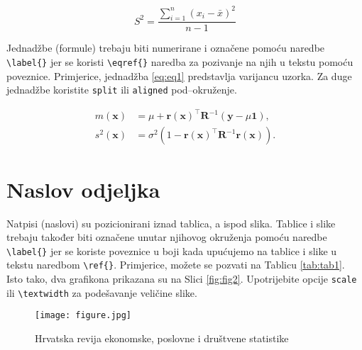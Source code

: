 \documentclass[
  letterpaper,
  DIV=11,
  numbers=noendperiod]{scrartcl}
\begin{document}
	\begin{equation} 
	S^2=\dfrac{\displaystyle\sum_{i=1}^{n}(x_i-\bar{x})^2}{n-1}
	\end{equation}
	
{\color{red} Jednadžbe (formule) trebaju biti numerirane i označene pomoću naredbe \verb=\label{}= jer se koristi \verb=\eqref{}= naredba za pozivanje na njih u tekstu pomoću poveznice.} Primjerice, {\color{blue} jednadžba} \eqref{eq:eq1} predstavlja varijancu uzorka. Za duge jednadžbe koristite \verb=split= ili \verb=aligned= pod--okruženje.
	
	\begin{equation} \label{eq:eq2}
	\begin{aligned}
	m(\textbf{x})&=\mu + \textbf{r}(\textbf{x})^\top \textbf{R}^{-1}(\textbf{y} - \mu \textbf{1}), \\
	s^2(\textbf{x})&=\sigma^2 \left(1 - \textbf{r}(\textbf{x})^\top \textbf{R}^{-1}\textbf{r}(\textbf{x}) \right).
	\end{aligned}
	\end{equation}
	

 
	\section{Naslov odjeljka}
{\color{red}Natpisi (naslovi) su pozicionirani iznad tablica, a ispod slika.} Tablice i slike trebaju također biti označene unutar njihovog okruženja pomoću naredbe \verb=\label{}= jer se koriste poveznice u boji kada upućujemo na tablice i slike u tekstu naredbom \verb=\ref{}=. Primjerice, možete se pozvati na {\color{blue} Tablicu} \ref{tab:tab1}. Isto tako, dva grafikona prikazana su na {\color{blue} Slici} \ref{fig:fig2}. Upotrijebite opcije \verb=scale= ili \verb=\textwidth= za podešavanje veličine slike.
	
	
		\begin{figure}[H] 
		\centering
			\texttt{[image: figure.jpg]}
			\caption{Hrvatska revija ekonomske, poslovne i društvene statistike}
			\label{fig:fig1}
		\end{figure}
\end{document}
